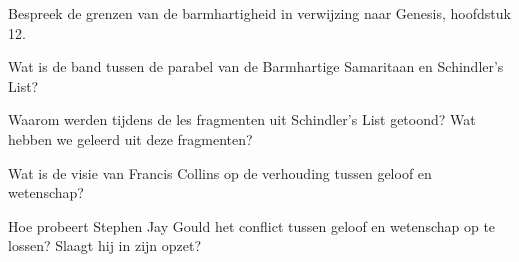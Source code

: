 \documentclass[main.tex]{subfiles}
\begin{document}
\begin{examenvraag}
    \begin{vraag}
        Bespreek de grenzen van de barmhartigheid in verwijzing naar Genesis, hoofdstuk 12.
    \end{vraag}

    \begin{antwoord}
    \end{antwoord}
\end{examenvraag}


\begin{examenvraag}
    \begin{vraag}
        Wat is de band tussen de parabel van de Barmhartige Samaritaan en Schindler’s List?
    \end{vraag}

    \begin{antwoord}
    \end{antwoord}
\end{examenvraag}


\begin{examenvraag}
    \begin{vraag}
        Waarom werden tijdens de les fragmenten uit Schindler’s List getoond? Wat hebben we geleerd uit deze fragmenten?
    \end{vraag}

    \begin{antwoord}
    \end{antwoord}
\end{examenvraag}


\begin{examenvraag}
    \begin{vraag}
        Wat is de visie van Francis Collins op de verhouding tussen geloof en wetenschap?
    \end{vraag}

    \begin{antwoord}
    \end{antwoord}
\end{examenvraag}


\begin{examenvraag}
    \begin{vraag}
        Hoe probeert Stephen Jay Gould het conflict tussen geloof en wetenschap op te lossen? Slaagt hij in zijn opzet?
    \end{vraag}

    \begin{antwoord}
    \end{antwoord}
\end{examenvraag}
\end{document}
